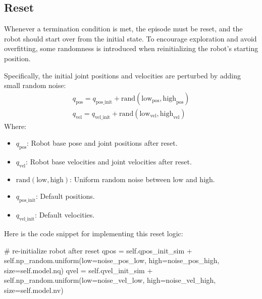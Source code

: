 \subsection{Reset}

Whenever a termination condition is met, the episode must be reset, and the robot should start over from the initial state. To encourage exploration and avoid overfitting, some randomness is introduced when reinitializing the robot's starting position.

Specifically, the initial joint positions and velocities are perturbed by adding small random noise:
\begin{equation*}
	\begin{aligned}
	q_{\mathrm{pos}} = q_{\mathrm{pos\_init}} + \mathrm{rand}(\mathrm{low}_{\mathrm{pos}}, \mathrm{high}_{\mathrm{pos}})
	\\
	q_{\mathrm{vel}} = q_{\mathrm{vel\_init}} + \mathrm{rand}(\mathrm{low}_{\mathrm{vel}}, \mathrm{high}_{\mathrm{vel}})
	\end{aligned}
\end{equation*}
Where:
\begin{itemize}
	\item $q_{\mathrm{pos}}$: Robot base pose and joint positions after reset.
	\item $q_{\mathrm{vel}}$: Robot base velocities and joint velocities after reset.
	\item $\mathrm{rand}(\mathrm{low}, \mathrm{high})$: Uniform random noise between $\mathrm{low}$ and $\mathrm{high}$.
	\item $q_{\mathrm{pos\_init}}$: Default positions.
	\item $q_{\mathrm{vel\_init}}$: Default velocities.
\end{itemize}

Here is the code snippet for implementing this reset logic:
\begin{pythoncode}
# re-initialize robot after reset
qpos = self.qpos_init_sim + self.np_random.uniform(low=noise_pos_low, high=noise_pos_high, size=self.model.nq) 
qvel = self.qvel_init_sim + self.np_random.uniform(low=noise_vel_low, high=noise_vel_high, size=self.model.nv)
\end{pythoncode}